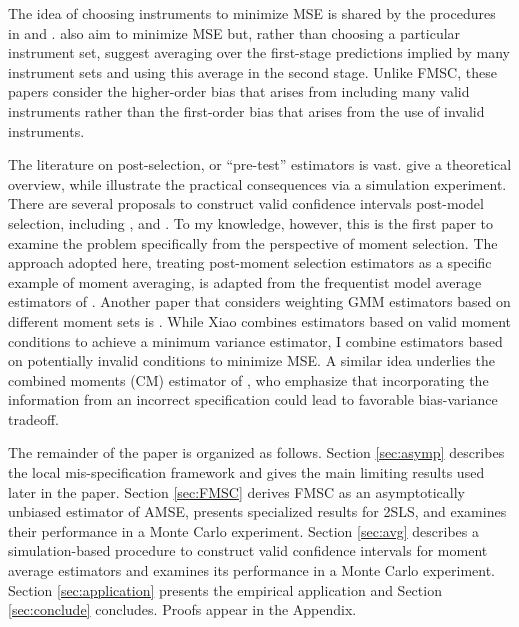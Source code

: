 \documentclass[12pt]{article}
\theoremstyle{definition}
\begin{document}
The idea of choosing instruments to minimize MSE is shared by the procedures in \cite{DonaldNewey2001} and \cite{DonaldImbensNewey2009}. 
\cite{KuersteinerOkui2010} also aim to minimize MSE but, rather than choosing a particular instrument set, suggest averaging over the first-stage predictions implied by many instrument sets and using this average in the second stage. 
Unlike FMSC, these papers consider the higher-order bias that arises from including many valid instruments rather than the first-order bias that arises from the use of invalid instruments.

The literature on post-selection, or ``pre-test'' estimators is vast. \citet{LeebPoetscher2005, LeebPoetscher2009}  give a theoretical overview, while \cite{Demetrescu} illustrate the practical consequences via a simulation experiment. There are several proposals to construct valid confidence intervals post-model selection, including \cite{Kabaila1998}, \cite{HjortClaeskens} and \cite{KabailaLeeb2006}. 
To my knowledge, however, this is the first paper to examine the problem specifically from the perspective of moment selection. The approach adopted here, treating post-moment selection estimators as a specific example of moment averaging, is adapted from the frequentist model average estimators of \cite{HjortClaeskens}.
Another paper that considers weighting GMM estimators based on different moment sets is \cite{Xiao}. While Xiao combines estimators based on valid moment conditions to achieve a minimum variance estimator, I combine estimators based on potentially invalid conditions to minimize MSE. 
A similar idea underlies the combined moments (CM) estimator of \cite{Judge2007}, who emphasize that incorporating the information from an incorrect specification could lead to favorable bias-variance tradeoff. 

The remainder of the paper is organized as follows.
Section \ref{sec:asymp} describes the local mis-specification framework and gives the main limiting results used later in the paper. 
Section \ref{sec:FMSC} derives FMSC as an asymptotically unbiased estimator of AMSE, presents specialized results for 2SLS, and examines their performance in a Monte Carlo experiment. 
Section \ref{sec:avg} describes a simulation-based procedure to construct valid confidence intervals for moment average estimators and examines its performance in a Monte Carlo experiment. Section \ref{sec:application} presents the empirical application and Section \ref{sec:conclude} concludes. 
Proofs appear in the Appendix.
\end{document}
